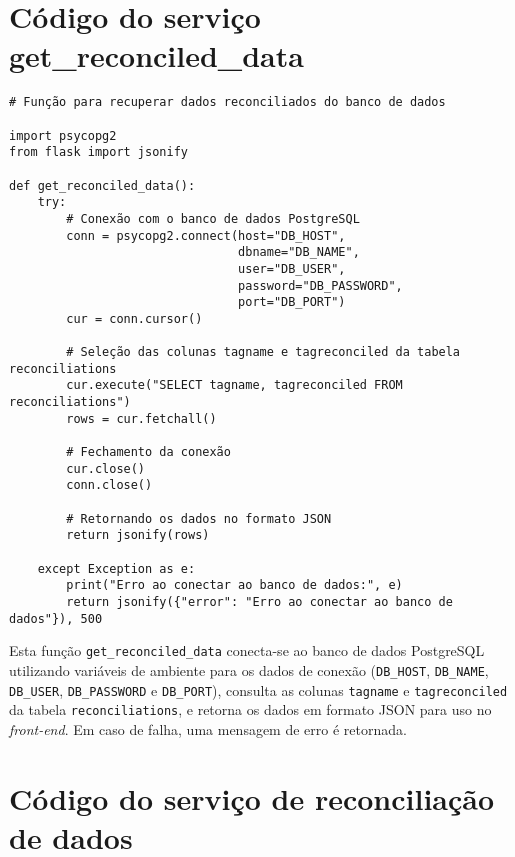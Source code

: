 \chapter{Código do serviço get\_reconciled\_data}
\label{Anexo:CodigoFunctionGetReconciledData}

\begin{verbatim}
# Função para recuperar dados reconciliados do banco de dados

import psycopg2
from flask import jsonify

def get_reconciled_data():
    try:
        # Conexão com o banco de dados PostgreSQL
        conn = psycopg2.connect(host="DB_HOST", 
                                dbname="DB_NAME", 
                                user="DB_USER", 
                                password="DB_PASSWORD",
                                port="DB_PORT")
        cur = conn.cursor()

        # Seleção das colunas tagname e tagreconciled da tabela reconciliations
        cur.execute("SELECT tagname, tagreconciled FROM reconciliations")
        rows = cur.fetchall()

        # Fechamento da conexão
        cur.close()
        conn.close()

        # Retornando os dados no formato JSON
        return jsonify(rows)
    
    except Exception as e:
        print("Erro ao conectar ao banco de dados:", e)
        return jsonify({"error": "Erro ao conectar ao banco de dados"}), 500
\end{verbatim}

Esta função \texttt{get\_reconciled\_data} conecta-se ao banco de dados PostgreSQL utilizando variáveis de ambiente para os dados de conexão (\texttt{DB\_HOST}, \texttt{DB\_NAME}, \texttt{DB\_USER}, \texttt{DB\_PASSWORD} e \texttt{DB\_PORT}), consulta as colunas \texttt{tagname} e \texttt{tagreconciled} da tabela \texttt{reconciliations}, e retorna os dados em formato JSON para uso no \textit{front-end}. Em caso de falha, uma mensagem de erro é retornada.

\chapter{Código do serviço de reconciliação de dados}
\label{Anexo:CodigoReconciliacaoDados}

